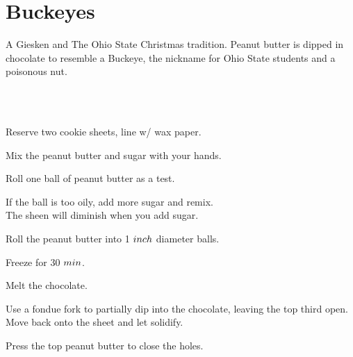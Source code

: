 \section{Buckeyes}

\begin{recipestats}[
        servings=48,
        preptime=15~\minute,
        inactivetime=30~\minute,
        original=Jim Giesken,
    ]
\end{recipestats}

\begin{recipeabstract}
    A Giesken and The Ohio State Christmas tradition.
    Peanut butter is dipped in chocolate to resemble a Buckeye, the nickname
    for Ohio State students and a poisonous nut.
\end{recipeabstract}

\begin{ingredientcolumns}[1]
    \begin{ingredientblock}
        \\
        \\
    \end{ingredientblock}
\end{ingredientcolumns}

\begin{preparation}
\item Reserve two cookie sheets, line w/ wax paper.
\item Mix the peanut butter and sugar with your hands.
\item Roll one ball of peanut butter as a test.
\item If the ball is too oily, add more sugar and remix.\\
    The sheen will diminish when you add sugar.
\item Roll the peanut butter into 1 $\inch$ diameter balls.
\item Freeze for 30 $\minute$.
\item Melt the chocolate.
\item Use a fondue fork to partially dip into the chocolate, leaving the top third open.
    Move back onto the sheet and let solidify.
\item Press the top peanut butter to close the holes.
\end{preparation}

\recipeend%
